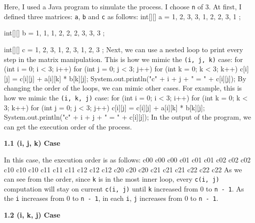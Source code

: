 \documentclass{article}%
\newenvironment{code}%
   {\snugshade\verbatim}%
   {\endverbatim\endsnugshade}
\begin{document}
\begin{Large}

Here, I used a Java program to simulate the process. I choose \texttt{n} of 3. At first, I defined three matrices: \texttt{a}, \texttt{b} and \texttt{c} as follows:
\begin{code}
    int[][] a = {
            {1, 2, 3},
            {3, 1, 2},
            {2, 3, 1}
    };

    int[][] b = {
            {1, 1, 1},
            {2, 2, 2},
            {3, 3, 3}
    };

    int[][] c = {
            {1, 2, 3},
            {1, 2, 3},
            {1, 2, 3}
    };
\end{code}
Next, we can use a nested loop to print every step in the matrix manipulation. This is how we mimic the \texttt{(i, j, k)} case:
\begin{code}
    for (int i = 0; i < 3; i++) {
        for (int j = 0; j < 3; j++) {
            for (int k = 0; k < 3; k++) {
                c[i][j] = c[i][j] + a[i][k] * b[k][j];
                System.out.println("c" + i + j + " = " + c[i][j]);
            }
        }
    }
\end{code}
\newpage
By changing the order of the loops, we can mimic other cases. For example, this is how we mimic the \texttt{(i, k, j)} case:
\begin{code}
    for (int i = 0; i < 3; i++) {
        for (int k = 0; k < 3; k++) {
            for (int j = 0; j < 3; j++) {
                c[i][j] = c[i][j] + a[i][k] * b[k][j];
                System.out.println("c" + i + j + " = " + c[i][j]);
            }
        }
    }
\end{code}
In the output of the program, we can get the execution order of the process.
\begin{LARGE}
\begin{flushleft}
\textbf{1.1 (i, j, k) Case}
\end{flushleft}
\end{LARGE}

In this case, the execution order is as follows:
\begin{code}
    c00 c00 c00 c01 c01 c01 c02 c02 c02 
    c10 c10 c10 c11 c11 c11 c12 c12 c12
    c20 c20 c20 c21 c21 c21 c22 c22 c22
\end{code}
As we can see from the order, since \texttt{k} is in the most inner loop, every \texttt{c(i, j)} computation will stay on current \texttt{c(i, j)} until \texttt{k} increased from 0 to \texttt{n - 1}. As the \texttt{i} increases from 0 to \texttt{n - 1}, in each \texttt{i}, \texttt{j} increases from 0 to \texttt{n - 1}.
\begin{LARGE}
\begin{flushleft}
\textbf{1.2 (i, k, j) Case}
\end{flushleft}
\end{LARGE}


\end{Large}
\end{document}
